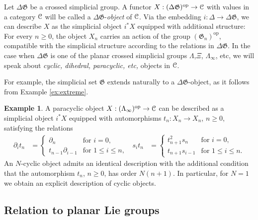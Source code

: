 \documentclass[english,11pt,leqno]{article}
\def\Gen{\mathfrak{G}}
\def\op{{\operatorname{op}}}
\def\C{{\EuScript C}}
\def\DG{ {\Delta \Gen}}
\theoremstyle{definition}
\newtheorem{exa}[thm]{Example}
\theoremstyle{remark}
\numberwithin{equation}{section}
\begin{document}
Let $\Delta \Gen$ be a crossed simplicial group.  A  functor $X: (\Delta \Gen)^{\op} \to \C$
with values in a category $\C$ will be called a $\DG$-{\em object} of $\C$. 
  Via the embedding $i: \Delta \to \Delta \Gen$, we can describe $X$ as
the simplicial object $i^* X$ equipped with additional structure: For every $n \ge 0$, the object
$X_n$ carries an action of the group $(\Gen_n)^{\op}$, compatible with the simplicial structure according to the
relations in $\Delta \Gen$. In the case when $\Delta\Gen$ is one of the planar crossed simplicial
groups $\Lambda$,$\Xi$, $\Lambda_\infty$, etc, we will speak about {\em cyclic, dihedral,
paracyclic, etc,} objects in $\C$. 

For example, the simplicial set $\Gen$ extends naturally to a $\DG$-object, as it follows from
Example \ref{ex:extreme}. 


\begin{exa} A paracyclic object $X: (\Lambda_{\infty})^{\op} \to \C$ can be described as a
simplicial object $i^* X$ equipped with automorphisms $t_n: X_n\to X_n$, $n \ge 0$, satisfying the relations 
\begin{align*}
	\partial_i t_n & = \begin{cases}
	\partial_n & \text{for $i = 0$,}\\
	t_{n-1}\partial_{i-1} & \text{for $1 \le i \le n$,}
	\end{cases} & 
	s_i t_n & = \begin{cases}
	t_{n+1}^2 s_n & \text{for $i = 0$,}\\ 
	t_{n+1}s_{i-1} & \text{for $1 \le i \le n$.}
	\end{cases} 
\end{align*}
An $N$-cyclic object admits an identical description with the additional condition that the automorphism
$t_n$, $n \ge 0$, has order $N(n+1)$. In particular, for $N=1$ we obtain an explicit description of cyclic objects.
\end{exa}



 
 
\subsection{Relation to planar Lie groups}
\end{document}
